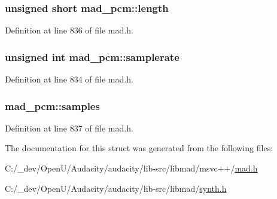 \subsubsection[{\texorpdfstring{length}{length}}]{\setlength{\rightskip}{0pt plus 5cm}unsigned short mad\+\_\+pcm\+::length}\hypertarget{structmad__pcm_a95e3411a4d6ec7bf2b17ff7a783eb01e}{}\label{structmad__pcm_a95e3411a4d6ec7bf2b17ff7a783eb01e}


Definition at line 836 of file mad.\+h.

\subsubsection[{\texorpdfstring{samplerate}{samplerate}}]{\setlength{\rightskip}{0pt plus 5cm}unsigned {\bf int} mad\+\_\+pcm\+::samplerate}\hypertarget{structmad__pcm_ace1a3d7e89cbd3176904c58e84cd7b2e}{}\label{structmad__pcm_ace1a3d7e89cbd3176904c58e84cd7b2e}


Definition at line 834 of file mad.\+h.

\subsubsection[{\texorpdfstring{samples}{samples}}]{ mad\+\_\+pcm\+::samples}\hypertarget{structmad__pcm_a855ec9f6dad7fad3a69d29abbe9a3ca3}{}\label{structmad__pcm_a855ec9f6dad7fad3a69d29abbe9a3ca3}


Definition at line 837 of file mad.\+h.



The documentation for this struct was generated from the following files\+:\begin{DoxyCompactItemize}
\item 
C\+:/\+\_\+dev/\+Open\+U/\+Audacity/audacity/lib-\/src/libmad/msvc++/\hyperlink{lib-src_2libmad_2msvc_09_09_2mad_8h}{mad.\+h}\item 
C\+:/\+\_\+dev/\+Open\+U/\+Audacity/audacity/lib-\/src/libmad/\hyperlink{synth_8h}{synth.\+h}\end{DoxyCompactItemize}
